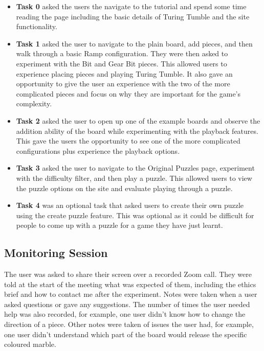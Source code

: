 \documentclass{l4proj}
\begin{document}
\begin{itemize}
    \item \textbf{Task 0} asked the users the navigate to the tutorial and spend some time reading the page including the basic details of Turing Tumble and the site functionality.
    \item \textbf{Task 1} asked the user to navigate to the plain board, add pieces, and then walk through a basic Ramp configuration. They were then asked to experiment with the Bit and Gear Bit pieces. This allowed users to experience placing pieces and playing Turing Tumble. It also gave an opportunity to give the user an experience with the two of the more complicated pieces and focus on why they are important for the game's complexity.
    \item \textbf{Task 2} asked the user to open up one of the example boards and observe the addition ability of the board while experimenting with the playback features. This gave the users the opportunity to see one of the more complicated configurations plus experience the playback options.
    \item \textbf{Task 3} asked the user to navigate to the Original Puzzles page, experiment with the difficulty filter, and then play a puzzle. This allowed users to view the puzzle options on the site and evaluate playing through a puzzle.
    \item \textbf{Task 4} was an optional task that asked users to create their own puzzle using the create puzzle feature. This was optional as it could be difficult for people to come up with a puzzle for a game they have just learnt.
\end{itemize}

\subsection{Monitoring Session}
The user was asked to share their screen over a recorded Zoom call. They were told at the start of the meeting what was expected of them, including the ethics brief and how to contact me after the experiment. Notes were taken when a user asked questions or gave any suggestions. The number of times the user needed help was also recorded, for example, one user didn't know how to change the direction of a piece. Other notes were taken of issues the user had, for example, one user didn't understand which part of the board would release the specific coloured marble.
\end{document}
